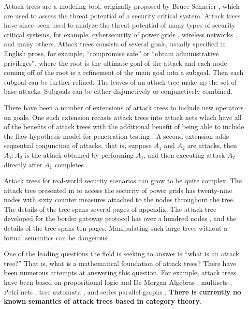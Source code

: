\documentclass{sigplanconf}
\begin{document}
Attack trees are a modeling tool, originally proposed by Bruce
Schneier \cite{Schneier:1999}, which are used to assess the threat
potential of a security critical system.  Attack trees have since been
used to analyze the threat potential of many types of security
critical systems, for example, cybersecurity of power grids
\cite{Ten:2007}, wireless networks \cite{Reinhardt:2012}, and many
others.  Attack trees consists of several goals, usually specified in
English prose, for example, ``compromise safe'' or ``obtain
administrative privileges'', where the root is the ultimate goal of
the attack and each node coming off of the root is a refinement of the
main goal into a subgoal.  Then each subgoal can be further refined.
The leaves of an attack tree make up the set of base attacks.
Subgoals can be either disjunctively or conjunctively combined.

There have been a number of extensions of attack trees to include new
operators on goals.  One such extension recasts attack trees into
attack nets which have all of the benefits of attack trees with the
additional benefit of being able to include the flaw hypothesis model
for penetration testing \cite{McDermott:2001}.  A second extension
adds sequential conjunction of attacks, that is, suppose $A_1$ and
$A_2$ are attacks, then $A_1;A_2$ is the attack obtained by performing
$A_1$, and then executing attack $A_2$ directly after $A_1$ completes
\cite{Jhawar:2015}.

Attack trees for real-world security scenarios can grow to be quite
complex.  The attack tree presented in \cite{Ten:2007} to access the
security of power grids has twenty-nine nodes with sixty counter
measures attached to the nodes throughout the tree.  The details of
the tree spans several pages of appendix.  The attack tree developed
for the border gateway protocol has over a hundred nodes
\cite{Convey:2003}, and the details of the tree spans ten pages.
Manipulating such large trees without a formal semantics can be
dangerous.

One of the leading questions the field is seeking to answer is ``what
is an attack tree?''  That is, what is a mathematical foundation of
attack trees? There have been numerous attempts at answering this
question.  For example, attack trees have been based on propositional
logic and De Morgan Algebras
\cite{Kordy:2014,Kordy:2012,Pietre-Cambacedes:2010}, multisets
\cite{Mauw:2006}, Petri nets \cite{McDermott:2001}, tree automata
\cite{Camtepe:2007}, and series parallel graphs
\cite{Jhawar:2015}. \textbf{There is currently no known semantics of
  attack trees based in category theory}.
\end{document}
